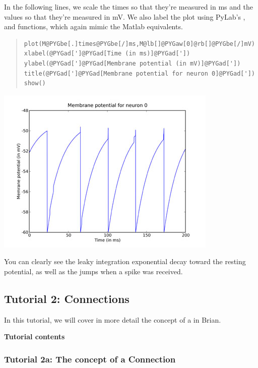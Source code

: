 \documentclass[letterpaper,10pt,english]{manual}
\begin{document}
In the following lines, we scale the times so that they're
measured in ms and the values so that they're measured in
mV. We also label the plot using PyLab's ,  and
 functions, which again mimic the Matlab equivalents.
\begin{quote}

\begin{Verbatim}[commandchars=@\[\]]
plot(M@PYGbe[.]times@PYGbe[/]ms,M@lb[]@PYGaw[0]@rb[]@PYGbe[/]mV)
xlabel(@PYGad[']@PYGad[Time (in ms)]@PYGad['])
ylabel(@PYGad[']@PYGad[Membrane potential (in mV)]@PYGad['])
title(@PYGad[']@PYGad[Membrane potential for neuron 0]@PYGad['])
show()
\end{Verbatim}
\end{quote}

\includegraphics{1g.jpg}

You can clearly see the leaky integration exponential decay
toward the resting potential, as well as the jumps when a
spike was received.

\resetcurrentobjects


\hypertarget{tutorial2-connections}{}\subsection{Tutorial 2: Connections}

In this tutorial, we will cover in more detail the concept of a \hyperlink{brian.Connection}{}
in Brian.

\textbf{Tutorial contents}

\resetcurrentobjects


\subsubsection{Tutorial 2a: The concept of a Connection}
\end{document}
